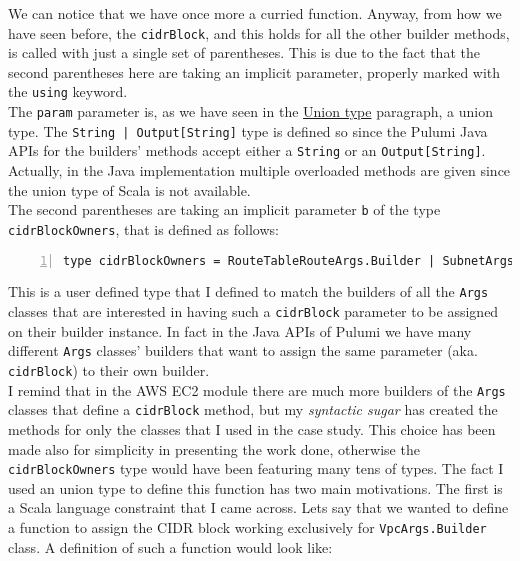 We can notice that we have once more a curried function.
Anyway, from how we have seen before, the \texttt{cidrBlock}, and this holds for all the other builder methods, is called with just a single set of parentheses.
This is due to the fact that the second parentheses here are taking an implicit parameter, properly marked with the \texttt{using} keyword.\\
The \texttt{param} parameter is, as we have seen in the \hyperref[sssec:union]{Union type} paragraph, a union type.
The \texttt{String | Output[String]} type is defined so since the Pulumi Java APIs for the builders' methods accept either a \texttt{String} or an \texttt{Output[String]}.
Actually, in the Java implementation multiple overloaded methods are given since the union type of Scala is not available.\\
The second parentheses are taking an implicit parameter \texttt{b} of the type \texttt{cidrBlockOwners}, that is defined as follows:\\
\begin{minipage}{\linewidth}
\begin{lstlisting}[numbers=left, numberstyle=\tiny, numbersep=-5pt, stepnumber=1, linewidth=420pt]
  type cidrBlockOwners = RouteTableRouteArgs.Builder | SubnetArgs.Builder | VpcArgs.Builder
\end{lstlisting}
\end{minipage}
This is a user defined type that I defined to match the builders of all the \texttt{Args} classes that are interested in having such a \texttt{cidrBlock} parameter to be assigned on their builder instance.
In fact in the Java APIs of Pulumi we have many different \texttt{Args} classes' builders that want to assign the same parameter (aka. \texttt{cidrBlock}) to their own builder.\\
I remind that in the AWS EC2 module there are much more builders of the \texttt{Args} classes that define a \texttt{cidrBlock} method, but my \textit{syntactic sugar} has created the methods for only the classes that I used in the case study.
This choice has been made also for simplicity in presenting the work done, otherwise the \texttt{cidrBlockOwners} type would have been featuring many tens of types.
The fact I used an union type to define this function has two main motivations.
The first is a Scala language constraint that I came across.
Lets say that we wanted to define a function to assign the CIDR block working exclusively for \texttt{VpcArgs.Builder} class.
A definition of such a function would look like:\\
